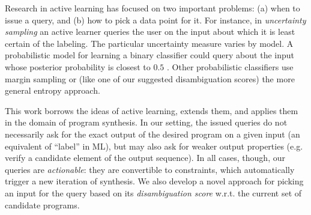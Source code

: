 Research in active learning has focused on two important problems: (a) when to issue a query, and (b) how to pick a data
point for it.
For instance, in \emph{uncertainty sampling} \cite{lewis} an active learner queries the user on the input about which it
is least certain of the labeling.
The particular uncertainty measure varies by model.
A probabilistic model for learning a binary classifier could query about the input whose posterior probability is
closest to $0.5$ \cite{lewis}.
Other probabilistic classifiers use margin sampling \cite{marginSampling} or (like one of our suggested disambiguation
scores) the more general entropy approach.

This work borrows the ideas of active learning, extends them, and applies them in the domain of program synthesis.
In our setting, the issued queries do not necessarily ask for the exact output of the desired program on a given input
(an equivalent of ``label'' in ML), but may also ask for weaker output properties (e.g.
verify a candidate element of the output sequence).
In all cases, though, our queries are \emph{actionable}: they are convertible to constraints, which automatically
trigger a new iteration of synthesis.
We also develop a novel approach for picking an input for the query based on its \emph{disambiguation score} w.r.t.
the current set of candidate programs.

